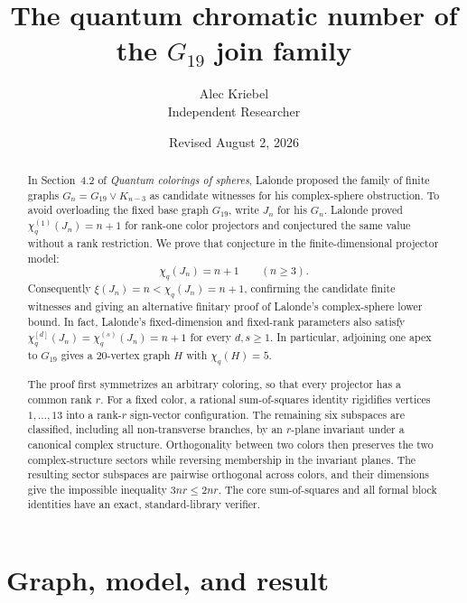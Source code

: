 \documentclass[11pt]{article}
\title{The quantum chromatic number of the $G_{19}$ join family}
\author{Alec Kriebel\\{\small Independent Researcher}}
\date{Revised August 2, 2026}
\newcommand{\join}{\mathbin{\vee}}
\begin{document}
\maketitle

\begin{abstract}
In Section~4.2 of \emph{Quantum colorings of spheres}, Lalonde proposed the
family of finite graphs $G_n=G_{19}\join K_{n-3}$ as candidate witnesses for his
complex-sphere obstruction.  To avoid overloading the fixed base graph
$G_{19}$, write $J_n$ for his $G_n$.  Lalonde proved
$\chi_q^{(1)}(J_n)=n+1$ for rank-one color projectors
\cite[Theorem~1.5]{Lalonde2026} and conjectured the same value without a rank
restriction.  We prove that conjecture in the finite-dimensional projector
model:
\[
   \chi_q(J_n)=n+1\qquad(n\geq3).
\]
Consequently $\xi(J_n)=n<\chi_q(J_n)=n+1$, confirming the candidate finite
witnesses and giving an alternative finitary proof of Lalonde's complex-sphere
lower bound.  In fact, Lalonde's fixed-dimension and fixed-rank parameters
also satisfy $\chi_q^{[d]}(J_n)=\chi_q^{(s)}(J_n)=n+1$ for every $d,s\geq1$.
In particular, adjoining one apex to $G_{19}$ gives a 20-vertex graph $H$ with
$\chi_q(H)=5$.

The proof first symmetrizes an arbitrary coloring, so that every projector
has a common rank $r$.  For a fixed color, a rational sum-of-squares identity
rigidifies vertices $1,\ldots,13$ into a rank-$r$ sign-vector configuration.
The remaining six subspaces are classified, including all non-transverse
branches, by an $r$-plane invariant under a canonical complex structure.
Orthogonality between two colors then preserves the two complex-structure
sectors while reversing membership in the invariant planes.  The resulting
sector subspaces are pairwise orthogonal across colors, and their dimensions
give the impossible inequality $3nr\leq2nr$.  The core sum-of-squares and all
formal block identities have an exact, standard-library verifier.
\end{abstract}

\section{Graph, model, and result}
\end{document}
